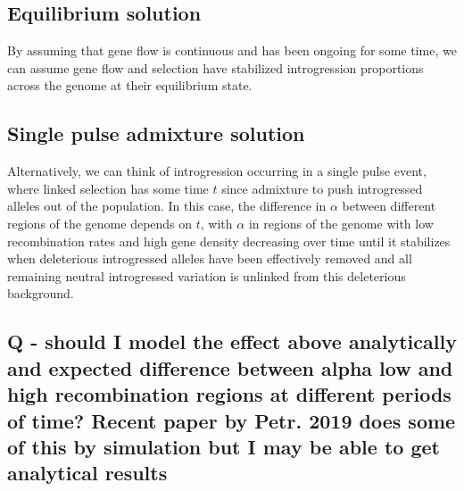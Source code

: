 \documentclass[12pt]{report}
\begin{document}
\subsection{Equilibrium solution}
By assuming that gene flow is continuous and has been ongoing for some time, we can assume gene flow and selection have stabilized introgression proportions across the genome at their equilibrium state.

\subsection{Single pulse admixture solution}
Alternatively, we can think of introgression occurring in a single pulse event, where linked selection has some time $t$ since admixture to push introgressed alleles out of the population. In this case, the difference in $\alpha$ between different regions of the genome depends on $t$, with $\alpha$ in regions of the genome with low recombination rates and high gene density decreasing over time until it stabilizes when deleterious introgressed alleles have been effectively removed and all remaining neutral introgressed variation is unlinked from this deleterious background.
\subsection{Q - should I model the effect above analytically and expected difference between alpha low and high recombination regions at different periods of time? Recent paper by Petr. 2019 does some of this by simulation but I may be able to get analytical results}
\end{document}
